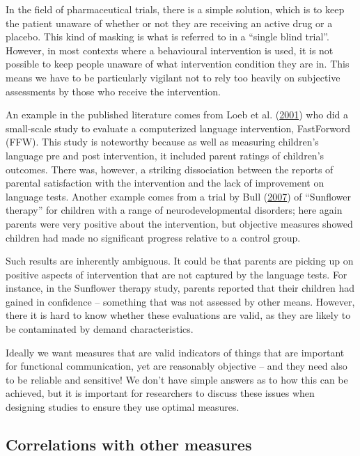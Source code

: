 \documentclass{krantz}
\begin{document}
In the field of pharmaceutical trials, there is a simple solution, which is to keep the patient unaware of whether or not they are receiving an active drug or a placebo. This kind of masking is what is referred to in a ``single blind trial''. However, in most contexts where a behavioural intervention is used, it is not possible to keep people unaware of what intervention condition they are in. This means we have to be particularly vigilant not to rely too heavily on subjective assessments by those who receive the intervention.

An example in the published literature comes from Loeb et al. (\protect\hyperlink{ref-loeb2001}{2001}) who did a small-scale study to evaluate a computerized language intervention, FastForword (FFW). This study is noteworthy because as well as measuring children's language pre and post intervention, it included parent ratings of children's outcomes. There was, however, a striking dissociation between the reports of parental satisfaction with the intervention and the lack of improvement on language tests. Another example comes from a trial by Bull (\protect\hyperlink{ref-bull2007}{2007}) of ``Sunflower therapy'' for children with a range of neurodevelopmental disorders; here again parents were very positive about the intervention, but objective measures showed children had made no significant progress relative to a control group.

Such results are inherently ambiguous. It could be that parents are picking up on positive aspects of intervention that are not captured by the language tests. For instance, in the Sunflower therapy study, parents reported that their children had gained in confidence -- something that was not assessed by other means. However, there it is hard to know whether these evaluations are valid, as they are likely to be contaminated by demand characteristics.

Ideally we want measures that are valid indicators of things that are important for functional communication, yet are reasonably objective -- and they need also to be reliable and sensitive! We don't have simple answers as to how this can be achieved, but it is important for researchers to discuss these issues when designing studies to ensure they use optimal measures.

\hypertarget{correlations-with-other-measures}{%
\subsection{Correlations with other measures}\label{correlations-with-other-measures}}
\end{document}
